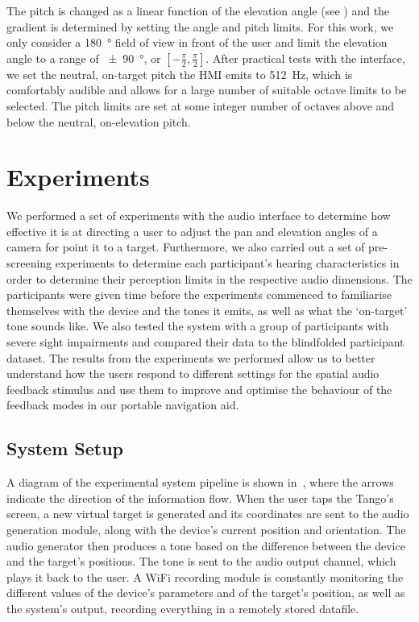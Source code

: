 \documentclass[acmsmall]{acmart}
\begin{document}
The pitch is changed as a linear function of the elevation angle (see ) and the gradient is determined by setting the angle and pitch limits.
For this work, we only consider a \SI{180}{\degree} field of view in front of the user and limit the elevation angle to a range of \SI{\pm90}{\degree}, or $[-\frac{\pi}{2}, \frac{\pi}{2}]$.
After practical tests with the interface, we set the neutral, on-target pitch the HMI emits to \SI{512}{\hertz}, which is comfortably audible and allows for a large number of suitable octave limits to be selected.
The pitch limits are set at some integer number of octaves above and below the neutral, on-elevation pitch.

\section{Experiments}\label{sec:experiments}

We performed a set of experiments with the audio interface to determine how effective it is at directing a user to adjust the pan and elevation angles of a camera for point it to a target.
Furthermore, we also carried out a set of pre-screening experiments to determine each participant's hearing characteristics in order to determine their perception limits in the respective audio dimensions.
The participants were given time before the experiments commenced to familiarise themselves with the device and the tones it emits, as well as what the `on-target' tone sounds like.
We also tested the system with a group of participants with severe sight impairments and compared their data to the blindfolded participant dataset.
The results from the experiments we performed allow us to better understand how the users respond to different settings for the spatial audio feedback stimulus and use them to improve and optimise the behaviour of the feedback modes in our portable navigation aid.

\subsection{System Setup}

A diagram of the experimental system pipeline is shown in~, where the arrows indicate the direction of the information flow.
When the user taps the Tango's screen, a new virtual target is generated and its coordinates are sent to the audio generation module, along with the device's current position and orientation.
The audio generator then produces a tone based on the difference between the device and the target's positions.
The tone is sent to the audio output channel, which plays it back to the user.
A WiFi recording module is constantly monitoring the different values of the device's parameters and of the target's position, as well as the system's output, recording everything in a remotely stored datafile. 
\end{document}
